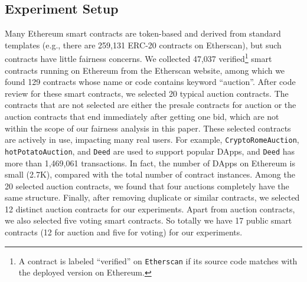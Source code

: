 \subsection{Experiment Setup} \label{section:experiment-setup}
Many Ethereum smart contracts are token-based and derived from standard templates (e.g., there are
259,131 ERC-20 contracts on Etherscan), but such contracts have little fairness concerns.
We collected 47,037 verified\footnote{A contract is labeled ``verified'' on \texttt{Etherscan} if
	its source code matches with the deployed version on Ethereum.} smart contracts running
on Ethereum from the Etherscan website,
among which we found 129 contracts whose name or code contains keyword ``auction''.
After code review for these smart contracts, we selected 20 typical auction contracts.
The contracts that are not selected are either the presale contracts for auction or
the auction contracts that end immediately after getting one bid, which are not within the scope of
our fairness analysis in this paper.
These selected contracts are actively in use, impacting many real users. For example,
\texttt{CryptoRomeAuction}, \texttt{hotPotatoAuction}, and \texttt{Deed} are used to support popular DApps, and
\texttt{Deed} has more than 1,469,061 transactions.
In fact, the number of DApps on Ethereum is
small (2.7K), compared with the total number of contract instances.
Among the 20 selected auction contracts, we found that four auctions completely have the same
structure. Finally, after removing duplicate or similar contracts, we selected 12 distinct auction
contracts for our experiments.
Apart from auction contracts, we also selected five voting smart contracts.
So totally we have 17 public smart contracts (12 for auction and five for voting) for our
experiments.

